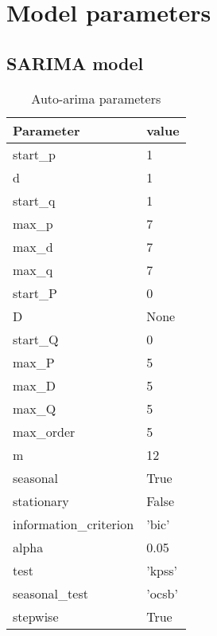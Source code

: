 \section{Model parameters}
\label{appendix:Model-Parameters}


\subsection{SARIMA model}

\begin{table}[H]
  \centering
  \caption{Auto-arima parameters}
  \label{table:auto-arima-parameters}
  \begin{tabular}{|l|l|}\hline
    Parameter              & value   \\ \hline
    \hline
    start\_p               & 1       \\ \hline
    d                      & 1       \\ \hline
    start\_q               & 1       \\ \hline
    max\_p                 & 7       \\ \hline
    max\_d                 & 7       \\ \hline
    max\_q                 & 7       \\ \hline
    start\_P               & 0       \\ \hline
    D                      & None    \\ \hline
    start\_Q               & 0       \\ \hline
    max\_P                 & 5       \\ \hline
    max\_D                 & 5       \\ \hline
    max\_Q                 & 5       \\ \hline
    max\_order             & 5       \\ \hline
    m                      & 12      \\ \hline
    seasonal               & True    \\ \hline
    stationary             & False   \\ \hline
    information\_criterion & 'bic'   \\ \hline
    alpha                  & 0.05    \\ \hline
    test                   & 'kpss'  \\ \hline
    seasonal\_test         & 'ocsb'  \\ \hline
    stepwise               & True    \\ \hline

\end{tabular}
\end{table}

